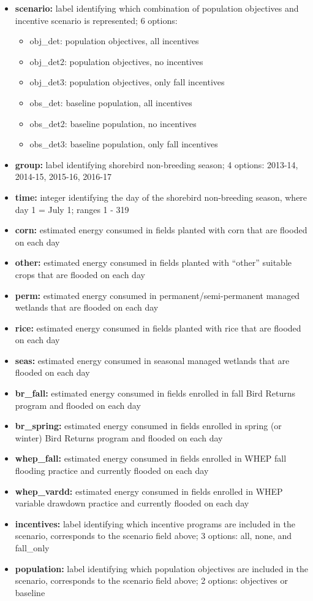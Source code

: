 \documentclass[]{article}
\providecommand{\tightlist}{%
  \setlength{\itemsep}{0pt}\setlength{\parskip}{0pt}}
\begin{document}
\begin{itemize}
\tightlist
\item
  \textbf{scenario:} label identifying which combination of population
  objectives and incentive scenario is represented; 6 options:

  \begin{itemize}
  \tightlist
  \item
    obj\_det: population objectives, all incentives
  \item
    obj\_det2: population objectives, no incentives
  \item
    obj\_det3: population objectives, only fall incentives
  \item
    obs\_det: baseline population, all incentives
  \item
    obs\_det2: baseline population, no incentives
  \item
    obs\_det3: baseline population, only fall incentives
  \end{itemize}
\item
  \textbf{group:} label identifying shorebird non-breeding season; 4
  options: 2013-14, 2014-15, 2015-16, 2016-17
\item
  \textbf{time:} integer identifying the day of the shorebird
  non-breeding season, where day 1 = July 1; ranges 1 - 319
\item
  \textbf{corn:} estimated energy consumed in fields planted with corn
  that are flooded on each day
\item
  \textbf{other:} estimated energy consumed in fields planted with
  ``other'' suitable crops that are flooded on each day
\item
  \textbf{perm:} estimated energy consumed in permanent/semi-permanent
  managed wetlands that are flooded on each day
\item
  \textbf{rice:} estimated energy consumed in fields planted with rice
  that are flooded on each day
\item
  \textbf{seas:} estimated energy consumed in seasonal managed wetlands
  that are flooded on each day
\item
  \textbf{br\_fall:} estimated energy consumed in fields enrolled in
  fall Bird Returns program and flooded on each day
\item
  \textbf{br\_spring:} estimated energy consumed in fields enrolled in
  spring (or winter) Bird Returns program and flooded on each day
\item
  \textbf{whep\_fall:} estimated energy consumed in fields enrolled in
  WHEP fall flooding practice and currently flooded on each day
\item
  \textbf{whep\_vardd:} estimated energy consumed in fields enrolled in
  WHEP variable drawdown practice and currently flooded on each day
\item
  \textbf{incentives:} label identifying which incentive programs are
  included in the scenario, corresponds to the scenario field above; 3
  options: all, none, and fall\_only
\item
  \textbf{population:} label identifying which population objectives are
  included in the scenario, corresponds to the scenario field above; 2
  options: objectives or baseline
\end{itemize}
\end{document}
